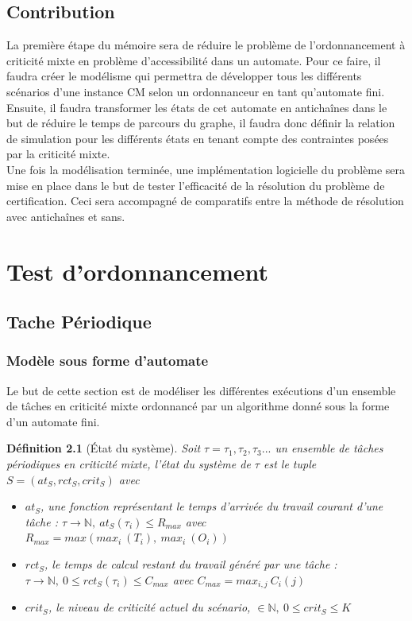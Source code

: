 \documentclass[a4paper]{report}
\theoremstyle{break}
\newtheorem{defin}{Définition}
\theoremstyle{breakplain}
\begin{document}
\section{Contribution}

La première étape du mémoire sera de réduire le problème de l'ordonnancement à criticité mixte en problème d'accessibilité dans un automate. Pour ce faire, il faudra créer le modélisme qui permettra de développer tous les différents scénarios d'une instance CM selon un ordonnanceur en tant qu'automate fini.\\

Ensuite, il faudra transformer les états de cet automate en antichaînes dans le but de réduire le temps de parcours du graphe, il faudra donc définir la relation de simulation pour les différents états en tenant compte des contraintes posées par la criticité mixte.\\

Une fois la modélisation terminée, une implémentation logicielle du problème sera mise en place dans le but de tester l'efficacité de la résolution du problème de certification. Ceci sera accompagné de comparatifs entre la méthode de résolution avec antichaînes et sans.


\chapter{Test d'ordonnancement}
\section{Tache Périodique}
\subsection{Modèle sous forme d'automate}

Le but de cette section est de modéliser les différentes exécutions d'un ensemble de tâches en criticité mixte ordonnancé par un algorithme donné sous la forme d'un automate fini.\\

\begin{defin}[État du système]
Soit $\tau = \tau_1, \tau_2, \tau_3 ...$ un ensemble de tâches périodiques en criticité mixte, l'état du système de $\tau$ est le tuple $S = (at_S, rct_S, crit_S)$ avec

\begin{itemize}
\item $at_S$, une fonction représentant le temps d'arrivée du travail courant d'une tâche : $\tau \rightarrow \mathbb{N},\ at_S(\tau_i) \leq R_{max}$ avec $R_{max} = max(max_i\ (T_i),\ max_i\ (O_i))$
\item $rct_S$, le temps de calcul restant du travail généré par une tâche : $ \tau \rightarrow \mathbb{N},\ 0 \leq rct_S(\tau_i) \leq C_{max}$ avec $C_{max} = max_{i,j}\ C_i(j)$
\item $crit_S$, le niveau de criticité actuel du scénario, $ \in \mathbb{N},\ 0 \leq crit_S \leq K$

\end{itemize}

\end{defin}
\end{document}
